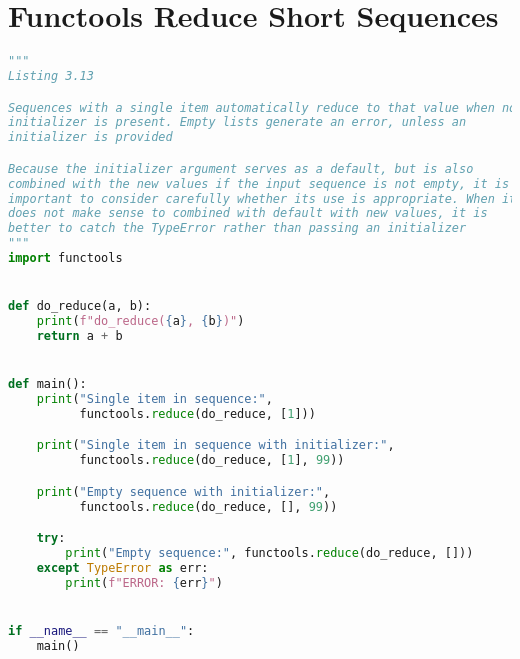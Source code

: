 \documentclass[a4paper,landscape]{report}
\begin{document}
\section{Functools Reduce Short Sequences}
\begin{lstlisting}[language=Python]
"""
Listing 3.13

Sequences with a single item automatically reduce to that value when no
initializer is present. Empty lists generate an error, unless an
initializer is provided

Because the initializer argument serves as a default, but is also
combined with the new values if the input sequence is not empty, it is
important to consider carefully whether its use is appropriate. When it
does not make sense to combined with default with new values, it is
better to catch the TypeError rather than passing an initializer
"""
import functools


def do_reduce(a, b):
    print(f"do_reduce({a}, {b})")
    return a + b


def main():
    print("Single item in sequence:",
          functools.reduce(do_reduce, [1]))

    print("Single item in sequence with initializer:",
          functools.reduce(do_reduce, [1], 99))

    print("Empty sequence with initializer:",
          functools.reduce(do_reduce, [], 99))

    try:
        print("Empty sequence:", functools.reduce(do_reduce, []))
    except TypeError as err:
        print(f"ERROR: {err}")


if __name__ == "__main__":
    main()

\end{lstlisting}
\end{document}
